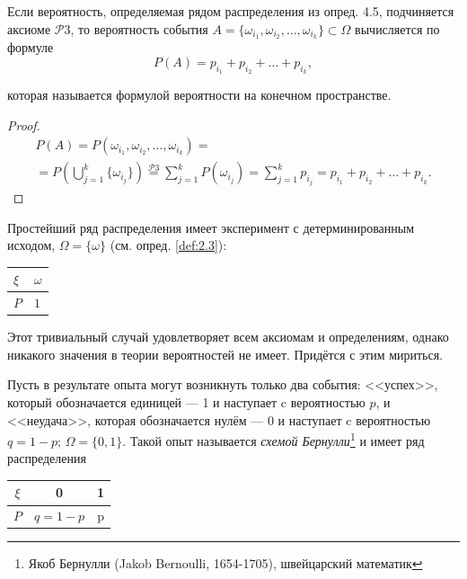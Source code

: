 \begin{deflemma}

Если  вероятность, определяемая рядом распределения из опред. 4.5, подчиняется аксиоме $\mathcal{P}3$, то вероятность события $A = \{\omega_{i_1} , \omega_{i_2} , \ldots ,  \omega_{i_k} \} \subset \Omega$ вычисляется по формуле
%
$$P(A) = p_{i_1} + p_{i_2} + \ldots + p_{i_k} ,$$

которая называется формулой вероятности на конечном пространстве.
\end{deflemma}
\begin{proof}
\begin{gather*}
 	P(A) = P (\omega_{i_1} , \omega_{i_2} , \ldots , \omega_{i_k}) =\\= P \left( \bigcup\limits_{j=1}^k \{\omega_{i_j} \} \right) \stackrel{\mathcal{P}3}{=} \sum_{j=1}^{k} P(\omega_{i_j}) = \sum_{j=1}^{k} p_{i_j} = p_{i_1} + p_{i_2} + \ldots + p_{i_k}.
\end{gather*}
\end{proof} 
\begin{example}
Простейший ряд распределения имеет эксперимент с детерминированным исходом, $\Omega = \{ \omega \}$ (см. опред. \ref{def:2.3}):
\begin{center}
	\begin{tabular}{|l|l|}
		\hline
		$\xi$ & $\omega$  \\ \hline
		$P$  & $1$  \\ \hline
	\end{tabular}
\end{center}
Этот тривиальный случай удовлетворяет всем аксиомам и определениям, однако никакого значения в теории вероятностей не имеет. Придётся с этим
мириться.
\end{example}
\begin{definition}
	Пусть в результате опыта могут возникнуть только
два события: <<успех>>, который обозначается единицей — 1 и наступает c вероятностью $p$, и <<неудача>>, которая обозначается нулём — 0 и наступает c
вероятностью $q = 1−p$; $\Omega = \{0, 1\}$. Такой опыт называется \textit{схемой Бернулли}\footnote{
	Якоб Бернулли (Jakob Bernoulli, 1654-1705), швейцарский математик
}
и имеет ряд распределения

\begin{center}
	\begin{tabular}{|c|c|c|}
		\hline
		$\xi$ & 0 & 1  \\ \hline
		$P$  & $q=1-p$ & p \\ \hline
	\end{tabular}
\end{center}

\end{definition}

